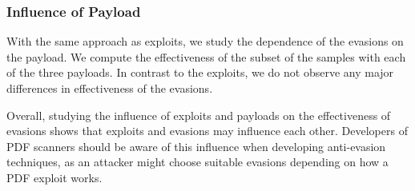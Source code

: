 \subsubsection{Influence of Payload}

With the same approach as exploits, we study the dependence of the evasions on the payload.
We compute the effectiveness of the subset of the samples with each of the three payloads.
In contrast to the exploits, we do not observe any major differences in effectiveness of the evasions.

\medskip
\noindent
Overall, studying the influence of exploits and payloads on the effectiveness of evasions shows that exploits and evasions may influence each other.
Developers of PDF scanners should be aware of this influence when developing anti-evasion techniques, as an attacker might choose suitable evasions depending on how a PDF exploit works.


